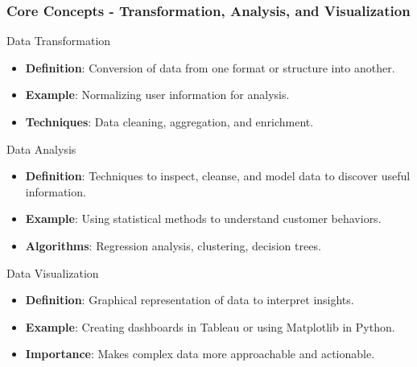 \documentclass[aspectratio=169]{beamer}
\begin{document}
\begin{frame}[fragile]
    \frametitle{Core Concepts - Transformation, Analysis, and Visualization}
    \begin{block}{Data Transformation}
        \begin{itemize}
            \item \textbf{Definition}: Conversion of data from one format or structure into another.
            \item \textbf{Example}: Normalizing user information for analysis.
            \item \textbf{Techniques}: Data cleaning, aggregation, and enrichment.
        \end{itemize}
    \end{block}

    \begin{block}{Data Analysis}
        \begin{itemize}
            \item \textbf{Definition}: Techniques to inspect, cleanse, and model data to discover useful information.
            \item \textbf{Example}: Using statistical methods to understand customer behaviors.
            \item \textbf{Algorithms}: Regression analysis, clustering, decision trees.
        \end{itemize}
    \end{block}
    
    \begin{block}{Data Visualization}
        \begin{itemize}
            \item \textbf{Definition}: Graphical representation of data to interpret insights.
            \item \textbf{Example}: Creating dashboards in Tableau or using Matplotlib in Python.
            \item \textbf{Importance}: Makes complex data more approachable and actionable.
        \end{itemize}
    \end{block}
\end{frame}
\end{document}
